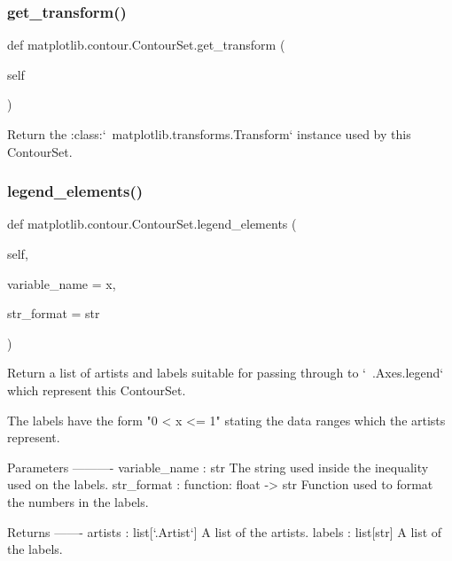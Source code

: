 \subsubsection{\texorpdfstring{get\+\_\+transform()}{get\_transform()}}
{\footnotesize\ttfamily def matplotlib.\+contour.\+Contour\+Set.\+get\+\_\+transform (\begin{DoxyParamCaption}\item[{}]{self }\end{DoxyParamCaption})}

\begin{DoxyVerb}Return the :class:`~matplotlib.transforms.Transform`
instance used by this ContourSet.
\end{DoxyVerb}
 \mbox{\label{classmatplotlib_1_1contour_1_1ContourSet_a890a8c685251eca05c1b800f1301e8cf}} 
\subsubsection{\texorpdfstring{legend\+\_\+elements()}{legend\_elements()}}
{\footnotesize\ttfamily def matplotlib.\+contour.\+Contour\+Set.\+legend\+\_\+elements (\begin{DoxyParamCaption}\item[{}]{self,  }\item[{}]{variable\+\_\+name = {\ttfamily \textquotesingle{}x\textquotesingle{}},  }\item[{}]{str\+\_\+format = {\ttfamily str} }\end{DoxyParamCaption})}

\begin{DoxyVerb}Return a list of artists and labels suitable for passing through
to `~.Axes.legend` which represent this ContourSet.

The labels have the form "0 < x <= 1" stating the data ranges which
the artists represent.

Parameters
----------
variable_name : str
    The string used inside the inequality used on the labels.
str_format : function: float -> str
    Function used to format the numbers in the labels.

Returns
-------
artists : list[`.Artist`]
    A list of the artists.
labels : list[str]
    A list of the labels.
\end{DoxyVerb}
 \mbox{\label{classmatplotlib_1_1contour_1_1ContourSet_a1ae000306e7e31d3cf55fab84a61d2a1}} 
